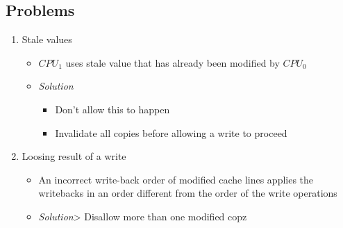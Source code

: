 \subsection{Problems}
\begin{enumerate}
	\item Stale values
		\begin{itemize}
			\item $CPU_1$ uses stale value that has already been modified by $CPU_0$
			\item \emph{Solution} 
				\begin{itemize}
					\item Don't allow this to happen
					\item Invalidate all copies before allowing a write to proceed
				\end{itemize}
		\end{itemize}
	\item Loosing result of a write
		\begin{itemize}
			\item An incorrect write-back order of modified cache lines applies the writebacks in an order different from the order of the write operations
			\item \emph{Solution}> Disallow more than one modified copz
		\end{itemize}
\end{enumerate}

